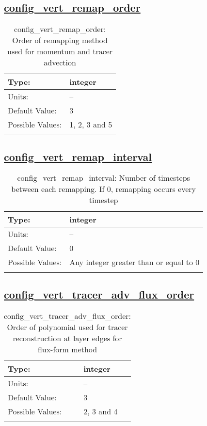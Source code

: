 \subsection[config\_vert\_remap\_order]{\hyperref[sec:nm_tab_advection]{config\_vert\_remap\_order}}
\label{subsec:nm_sec_config_vert_remap_order}
\begin{center}
\begin{longtable}{| p{2.0in} || p{4.0in} |}
    \hline
    Type: & integer \\
    \hline
    Units: & -- \\
    \hline
    Default Value: & 3 \\
    \hline
    Possible Values: & 1, 2, 3 and 5 \\
    \hline
    \caption{config\_vert\_remap\_order: Order of remapping method used for momentum and tracer advection}
\end{longtable}
\end{center}
\subsection[config\_vert\_remap\_interval]{\hyperref[sec:nm_tab_advection]{config\_vert\_remap\_interval}}
\label{subsec:nm_sec_config_vert_remap_interval}
\begin{center}
\begin{longtable}{| p{2.0in} || p{4.0in} |}
    \hline
    Type: & integer \\
    \hline
    Units: & -- \\
    \hline
    Default Value: & 0 \\
    \hline
    Possible Values: & Any integer greater than or equal to 0 \\
    \hline
    \caption{config\_vert\_remap\_interval: Number of timesteps between each remapping. If 0, remapping occurs every timestep}
\end{longtable}
\end{center}
\subsection[config\_vert\_tracer\_adv\_flux\_order]{\hyperref[sec:nm_tab_advection]{config\_vert\_tracer\_adv\_flux\_order}}
\label{subsec:nm_sec_config_vert_tracer_adv_flux_order}
\begin{center}
\begin{longtable}{| p{2.0in} || p{4.0in} |}
    \hline
    Type: & integer \\
    \hline
    Units: & -- \\
    \hline
    Default Value: & 3 \\
    \hline
    Possible Values: & 2, 3 and 4 \\
    \hline
    \caption{config\_vert\_tracer\_adv\_flux\_order: Order of polynomial used for tracer reconstruction at layer edges for flux-form method}
\end{longtable}
\end{center}
